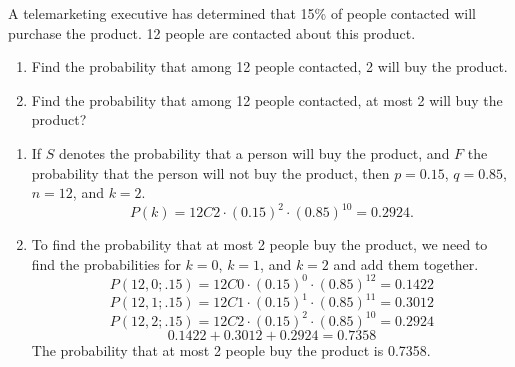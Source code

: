 \begin{example}
    A telemarketing executive has determined that 15\% of people contacted will purchase the product. 12 people are contacted about this product.
    \begin{enumerate}
        \item Find the probability that among 12 people contacted, 2 will buy the product.
        \item Find the probability that among 12 people contacted, at most 2 will buy the product?
    \end{enumerate}
\end{example}
\begin{solution}
    \begin{enumerate}
        \item If \( S \) denotes the probability that a person will buy the product, and \( F \) the probability that the person will not buy the product, then \( p = 0.15 \), \( q = 0.85 \), \( n = 12 \), and \( k = 2 \).
              \[ P(k) = 12C2 \cdot (0.15)^2 \cdot (0.85)^{10} = 0.2924. \]

        \item To find the probability that at most 2 people buy the product, we need to find the probabilities for \( k=0 \), \( k=1 \), and \( k=2 \) and add them together.
              \[P(12,0;.15) = 12C0 \cdot (0.15)^0 \cdot (0.85)^{12} = 0.1422\]
              \[P(12,1;.15) = 12C1 \cdot (0.15)^1 \cdot (0.85)^{11} =  0.3012\]
              \[P(12,2;.15) = 12C2 \cdot (0.15)^2 \cdot (0.85)^{10} =  0.2924\]
              \[0.1422 + 0.3012 + 0.2924 = 0.7358\]
              The probability that at most 2 people buy the product is 0.7358.
    \end{enumerate}
\end{solution}
